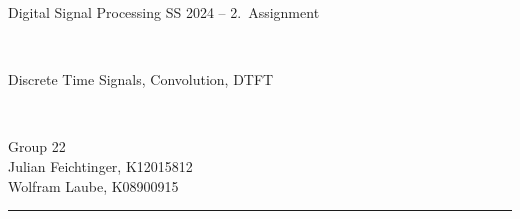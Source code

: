 \documentclass[12pt,a4paper,austrian]{article}
\begin{document}
\pagestyle{plain}


\thispagestyle{empty}
\noindent
\begin{minipage}[b][4cm]{1.0\textwidth}  
\begin{center}
\begin{bf} 
\begin{large} Digital Signal Processing SS 2024 -- 2.~Assignment\end{large} \\
\vspace{0.3cm}
\begin{Large} Discrete Time Signals, Convolution, DTFT  \end{Large} \\
\vspace{0.3cm}
\end{bf}
\begin{large}
Group 22\\
Julian Feichtinger, K12015812\\
Wolfram Laube, K08900915\\
\end{large} 
\end{center}
\end{minipage}

\noindent \rule[0.8em]{\textwidth}{0.12mm}\\[-0.5em]
\end{document}
